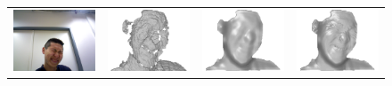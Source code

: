 \begin{figure}[!ht]
{\begin{tabular}{c|c c c}
   \includegraphics[height = 0.19\linewidth]{figures/methodology/rgbd_face_rgb.pdf} \hspace{0.05cm}
   &
   \includegraphics[height = 0.19\linewidth]{figures/methodology/rgbd_face_shape_init.pdf} &
   \includegraphics[height = 0.19\linewidth]{figures/methodology/rgbd_face_shape_smooth.pdf} &
   \includegraphics[height = 0.19\linewidth]{figures/methodology/rgbd_face_shape.pdf} \\
   

\end{tabular}}
\end{figure}
